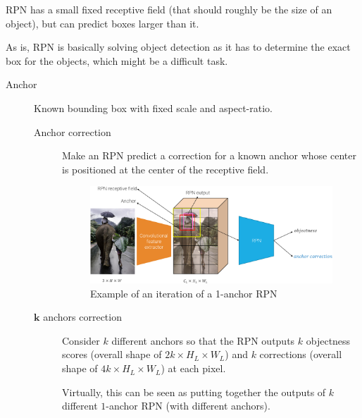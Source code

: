 \begin{description}
\begin{description}
            \begin{remark}
                RPN has a small fixed receptive field (that should roughly be the size of an object), but can  predict boxes larger than it.
            \end{remark}

            \begin{remark}
                As is, RPN is basically solving object detection as it has to determine the exact box for the objects, which might be a difficult task.
            \end{remark}

            \begin{description}
                \item[Anchor] 
                    Known bounding box with fixed scale and aspect-ratio.

                \begin{description}
                    \item[Anchor correction] 
                        Make an RPN predict a correction for a known anchor whose center is positioned at the center of the receptive field.

                        \begin{figure}[H]
                            \raggedleft
                            \includegraphics[width=0.8\linewidth]{./img/_rpn_anchor.pdf}
                            \caption{Example of an iteration of a 1-anchor RPN}
                        \end{figure}

                    \item[$\mathbf{k}$ anchors correction] 
                        Consider $k$ different anchors so that the RPN outputs $k$ objectness scores (overall shape of $2k \times H_L \times W_L$) and $k$ corrections (overall shape of $4k \times H_L \times W_L$) at each pixel.

                        \begin{remark}
                            Virtually, this can be seen as putting together the outputs of $k$ different $1$-anchor RPN (with different anchors).
                        \end{remark}
                \end{description}


\end{description}
\end{description}
\end{description}
